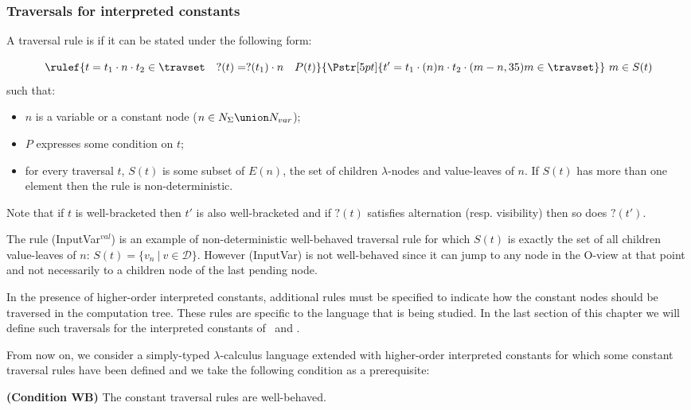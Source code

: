 \subsubsection{Traversals for interpreted constants}

\begin{definition}
\label{def:wellbehaved_traversal} A traversal rule is
 if it can be stated under the following form:
$$\rulef{t = t_1\cdot n \cdot t_2 \in \travset \quad ?(t) = ?(t_1) \cdot n \quad P(t)}
  { \stackrel{  \rule{0pt}{3pt} }{\Pstr[5pt]{ t' = t_1\cdot (n){n} \cdot t_2 \cdot (m-n,35){m} \in \travset}}
   }
    \ m\in S(t)
   $$
such that:
\begin{itemize}[i.]
  \item $n$ is a variable or a constant node ($n \in N_{\Sigma}\union N_{var}$);
  \item $P$ expresses some condition on $t$;
  \item for every traversal $t$, $S(t)$ is some subset of $E(n)$, the set of children $\lambda$-nodes and value-leaves of $n$.
  If $S(t)$ has more than one element then the rule is non-deterministic.
\end{itemize}
\end{definition}
Note that if $t$ is well-bracketed then $t'$ is also well-bracketed
and if $?(t)$ satisfies alternation (resp. visibility) then so does
$?(t')$.


\begin{example} The rule (InputVar$^{val}$) is an example of non-deterministic well-behaved traversal rule for which $S(t)$ is exactly the set of all children value-leaves of $n$:
$S(t) = \{ v_n \ | \ v \in \mathcal{D} \} $.
However (InputVar) is not well-behaved since it can jump to any node in the O-view at that point and not necessarily to a children node of the last pending node.
\end{example}

In the presence of higher-order interpreted constants, additional rules must be specified to indicate how
the constant nodes should be traversed in the computation tree. These rules
are specific to the language that is being studied.
In the last section of this chapter we will define such traversals for the interpreted constants of
\pcf\ and \ialgol.

From now on, we consider a simply-typed $\lambda$-calculus language extended with
higher-order interpreted constants for which some constant traversal rules have been defined
and we take the following condition as a prerequisite:
\begin{center}
  \textbf{(Condition WB)} The constant traversal rules are well-behaved.
\end{center}


